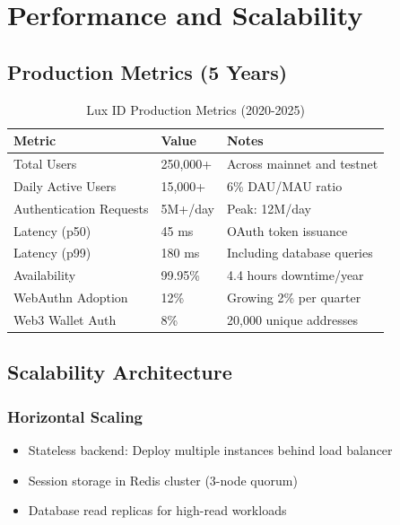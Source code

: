 \section{Performance and Scalability}


\subsection{Production Metrics (5 Years)}

\begin{table}[h]
\centering
\begin{tabular}{@{}lll@{}}
\toprule
\textbf{Metric} & \textbf{Value} & \textbf{Notes} \\ \midrule
Total Users & 250,000+ & Across mainnet and testnet \\
Daily Active Users & 15,000+ & 6\% DAU/MAU ratio \\
Authentication Requests & 5M+/day & Peak: 12M/day \\
Latency (p50) & 45 ms & OAuth token issuance \\
Latency (p99) & 180 ms & Including database queries \\
Availability & 99.95\% & 4.4 hours downtime/year \\
WebAuthn Adoption & 12\% & Growing 2\% per quarter \\
Web3 Wallet Auth & 8\% & 20,000 unique addresses \\ \bottomrule
\end{tabular}
\caption{Lux ID Production Metrics (2020-2025)}
\end{table}

\subsection{Scalability Architecture}

\subsubsection{Horizontal Scaling}

\begin{itemize}
  \item Stateless backend: Deploy multiple instances behind load balancer
  \item Session storage in Redis cluster (3-node quorum)
  \item Database read replicas for high-read workloads
\end{itemize}

